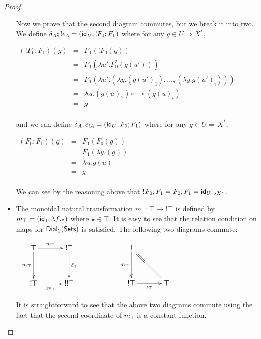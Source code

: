 \begin{proof}
\begin{report}
\begin{center}
\begin{itemize}
      Now we prove that the second diagram commutes, but we break it
      into two.  
      We define $\delta_A;!\epsilon_A = (\mathsf{id}_U,!F_0;F_1)$ where for
      any $g \in U \Rightarrow X^*$,
      \begin{center}
        \begin{math}
          \begin{array}{lll}
            (!F_0;F_1)(g) 
            & = & F_1(!F_0(g))\\
            & = & F_1(\lambda u'.F_0^*(g(u')))\\
            & = & F_1(\lambda u'.(\lambda y.(g(u')_1),\ldots,(\lambda y.g(u')_i)))\\
            & = & \lambda u.(g(u)_1) \circ \cdots \circ (g(u)_i)\\
            & = & g\\
          \end{array}
        \end{math}
      \end{center}
      and we can define $\delta_A;\epsilon_{!A} = (\mathsf{id}_U,F_0;F_1)$ where for
      any $g \in U \Rightarrow X^*$,
      \begin{center}
        \begin{math}
          \begin{array}{lll}
            (F_0;F_1)(g) 
            & = & F_1(F_0(g))\\
            & = & F_1(\lambda y.(g))\\
            & = & \lambda u.g(u)\\
            & = & g\\
          \end{array}
        \end{math}
      \end{center}
      We can see by the reasoning above that
      $!F_0;F_1 = F_0;F_1 = \mathsf{id}_{U \Rightarrow X^*}$.

    \item The monoidal natural transformation $m_{\top} : \top \to !\top$
      is defined by $m_{\top} = (\mathsf{id}_1,\lambda f.\star)$ where $\star \in \top$. 
      It is easy to see that the relation condition
      on maps for $\mathsf{Dial_2}(\mathsf{Sets})$ is satisfied.  The following two diagrams
      commute:
      \begin{center}
        \begin{math}
          \begin{array}{lll}
            \bfig
            \square[\top`!\top`!\top`!!\top;m_\top`m_\top`\delta_\top`!m_\top]
            \efig
            &
              \,\,\,\,\,\,\,\,\,\,\,\,\,\,\,\,\,\,\,\,
            &
              \bfig
              \btriangle/->`=`->/[\top`!\top`\top;m_\top``\epsilon_{\top}]
           \efig
          \end{array}
        \end{math}
      \end{center}
      It is straightforward to see that the above two diagrams commute
      using the fact that the second coordinate of $m_\top$ is a
      constant function.


\end{itemize}
\end{center}
\end{report}
\end{proof}

